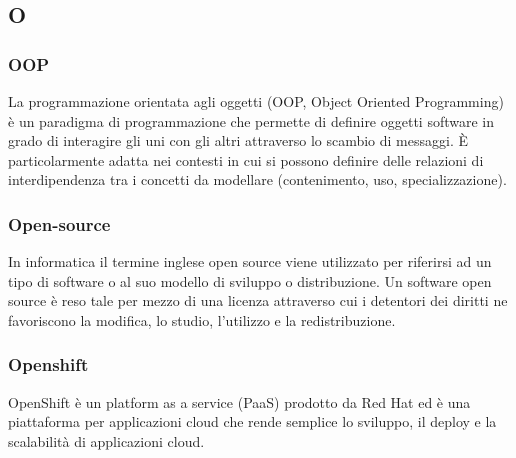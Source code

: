 \subsection*{\textbf{\hfill \Huge{O} \hfill}} 
\subsubsection*{OOP}
La programmazione orientata agli oggetti (OOP, Object Oriented Programming) è un paradigma di programmazione che permette di definire oggetti software in grado di interagire gli uni con gli altri attraverso lo scambio di messaggi. È particolarmente adatta nei contesti in cui si possono definire delle relazioni di interdipendenza tra i concetti da modellare (contenimento, uso, specializzazione).
\subsubsection*{Open-source}
In informatica il termine inglese open source viene utilizzato per riferirsi ad un tipo di software o al suo modello di sviluppo o distribuzione. Un software open source è reso tale per mezzo di una licenza attraverso cui i detentori dei diritti ne favoriscono la modifica, lo studio, l'utilizzo e la redistribuzione.
\subsubsection*{Openshift}
OpenShift è un platform as a service (PaaS) prodotto da Red Hat ed è una piattaforma per applicazioni cloud che rende semplice lo sviluppo, il deploy e la scalabilità di applicazioni cloud.
